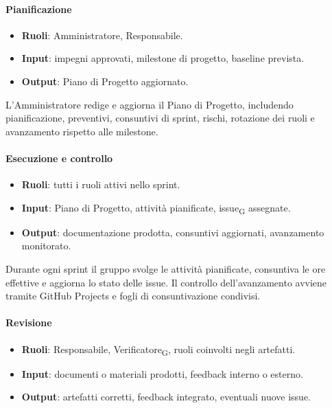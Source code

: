 \paragraph{Pianificazione}

\begin{itemize}
    \item \textbf{Ruoli}: Amministratore, Responsabile.
    \item \textbf{Input}: impegni approvati, milestone di progetto, baseline prevista.
    \item \textbf{Output}: Piano di Progetto aggiornato.
\end{itemize}

L'Amministratore redige e aggiorna il Piano di Progetto, includendo pianificazione,
preventivi, consuntivi di sprint, rischi, rotazione dei ruoli e avanzamento rispetto
alle milestone.

\paragraph{Esecuzione e controllo}

\begin{itemize}
    \item \textbf{Ruoli}: tutti i ruoli attivi nello sprint.
    \item \textbf{Input}: Piano di Progetto, attività pianificate, issue\textsubscript{G} assegnate.
    \item \textbf{Output}: documentazione prodotta, consuntivi aggiornati, avanzamento
    monitorato.
\end{itemize}

Durante ogni sprint il gruppo svolge le attività pianificate, consuntiva le ore
effettive e aggiorna lo stato delle issue. Il controllo dell'avanzamento avviene
tramite GitHub Projects e fogli di consuntivazione condivisi.

\paragraph{Revisione}

\begin{itemize}
    \item \textbf{Ruoli}: Responsabile, Verificatore\textsubscript{G}, ruoli coinvolti negli artefatti.
    \item \textbf{Input}: documenti o materiali prodotti, feedback interno o esterno.
    \item \textbf{Output}: artefatti corretti, feedback integrato, eventuali nuove issue.
\end{itemize}

